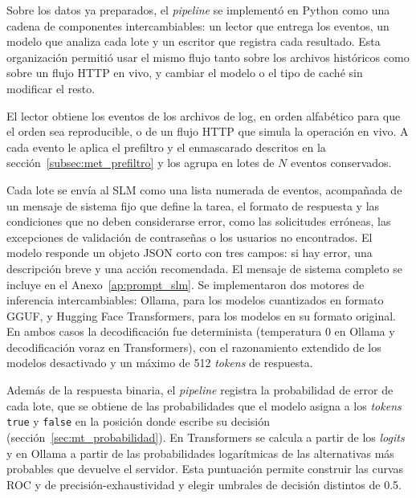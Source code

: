 Sobre los datos ya preparados, el \textit{pipeline} se implementó en Python como una cadena de componentes intercambiables: un lector que entrega los eventos, un modelo que analiza cada lote y un escritor que registra cada resultado. Esta organización permitió usar el mismo flujo tanto sobre los archivos históricos como sobre un flujo HTTP en vivo, y cambiar el modelo o el tipo de caché sin modificar el resto.


El lector obtiene los eventos de los archivos de log, en orden alfabético para que el orden sea reproducible, o de un flujo HTTP que simula la operación en vivo. A cada evento le aplica el prefiltro y el enmascarado descritos en la sección~\ref{subsec:met_prefiltro} y los agrupa en lotes de $N$ eventos conservados.


Cada lote se envía al SLM como una lista numerada de eventos, acompañada de un mensaje de sistema fijo que define la tarea, el formato de respuesta y las condiciones que no deben considerarse error, como las solicitudes erróneas, las excepciones de validación de contraseñas o los usuarios no encontrados. El modelo responde un objeto JSON corto con tres campos: si hay error, una descripción breve y una acción recomendada. El mensaje de sistema completo se incluye en el Anexo~\ref{ap:prompt_slm}. Se implementaron dos motores de inferencia intercambiables: Ollama, para los modelos cuantizados en formato GGUF, y Hugging Face Transformers, para los modelos en su formato original. En ambos casos la decodificación fue determinista (temperatura 0 en Ollama y decodificación voraz en Transformers), con el razonamiento extendido de los modelos desactivado y un máximo de 512 \textit{tokens} de respuesta.


Además de la respuesta binaria, el \textit{pipeline} registra la probabilidad de error de cada lote, que se obtiene de las probabilidades que el modelo asigna a los \textit{tokens} \texttt{true} y \texttt{false} en la posición donde escribe su decisión (sección~\ref{sec:mt_probabilidad}). En Transformers se calcula a partir de los \textit{logits} y en Ollama a partir de las probabilidades logarítmicas de las alternativas más probables que devuelve el servidor. Esta puntuación permite construir las curvas ROC y de precisión-exhaustividad y elegir umbrales de decisión distintos de 0.5.


